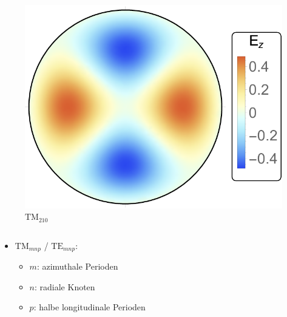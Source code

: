 \documentclass[12pt,xcolor=dvipsnames,professionalfonts]{beamer}
\begin{document}
\begin{frame}[t]
\begin{columns}[T]
		\begin{figure}[h]
			\centering
			\hspace*{0.70cm}\includegraphics[scale=0.4]{./figures/tm210.pdf}
			\vspace*{-0.2cm}
			\caption{$\mathrm{TM}_{210}$}
		\end{figure}
	\end{columns}
	\vfill
	\begin{itemize}
		\item $\mathrm{TM}_{mnp}$ / $\mathrm{TE}_{mnp}$:
		\begin{itemize}
			\setlength\itemsep{0.25em}
			\item $m$: azimuthale Perioden
			\item $n$: radiale Knoten
			\item $p$: halbe longitudinale Perioden
		\end{itemize}
	\end{itemize}
\end{frame}
\end{document}
